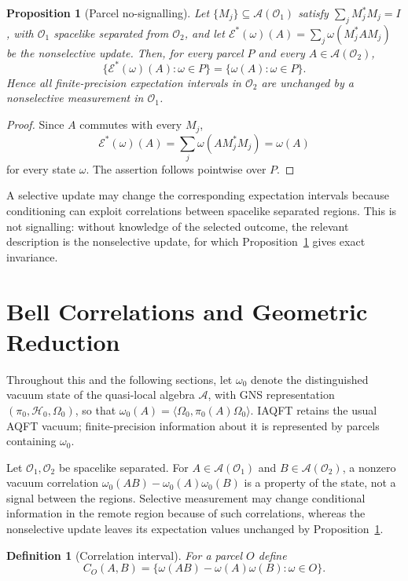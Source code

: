 \documentclass[11pt]{article}
\newtheorem{definition}[theorem]{Definition}
\newtheorem{proposition}[theorem]{Proposition}
\newcommand{\A}{\mathcal{A}}
\begin{document}
\begin{proposition}[Parcel no-signalling]
\label{prop:nosignalling}
Let $\{M_j\}\subseteq\A(\mathcal O_1)$ satisfy
$\sum_jM_j^*M_j=I$, with $\mathcal O_1$ spacelike separated from
$\mathcal O_2$, and let
$\mathcal E^*(\omega)(A)=\sum_j\omega(M_j^*AM_j)$ be the nonselective
update. Then, for every parcel $P$ and every $A\in\A(\mathcal O_2)$,
\[
\{\mathcal E^*(\omega)(A):\omega\in P\}
=
\{\omega(A):\omega\in P\}.
\]
Hence all finite-precision expectation intervals in $\mathcal O_2$ are
unchanged by a nonselective measurement in $\mathcal O_1$.
\end{proposition}

\begin{proof}
Since $A$ commutes with every $M_j$,
\[
\mathcal E^*(\omega)(A)
=
\sum_j\omega(AM_j^*M_j)
=
\omega(A)
\]
for every state $\omega$. The assertion follows pointwise over $P$.
\end{proof}

A selective update may change the corresponding expectation intervals
because conditioning can exploit correlations between spacelike separated
regions. This is not signalling: without knowledge of the selected outcome,
the relevant description is the nonselective update, for which
Proposition~\ref{prop:nosignalling} gives exact invariance.
\section{Bell Correlations and Geometric Reduction}
\label{sec:Bell-correlation}

Throughout this and the following sections, let $\omega_0$ denote the
distinguished vacuum state of the quasi-local algebra $\A$, with GNS
representation $(\pi_0,\mathcal H_0,\Omega_0)$, so that
$\omega_0(A)=\langle\Omega_0,\pi_0(A)\Omega_0\rangle$. IAQFT retains the
usual AQFT vacuum; finite-precision information about it is represented
by parcels containing $\omega_0$.

Let $\mathcal O_1,\mathcal O_2$ be spacelike separated. For
$A\in\A(\mathcal O_1)$ and $B\in\A(\mathcal O_2)$, a nonzero vacuum
correlation
$\omega_0(AB)-\omega_0(A)\omega_0(B)$ is a property of the state, not a
signal between the regions. Selective measurement may change conditional
information in the remote region because of such correlations, whereas
the nonselective update leaves its expectation values unchanged by
Proposition~\ref{prop:nosignalling}.

\begin{definition}[Correlation interval]
\label{def:correlationinterval}
For a parcel $O$ define
\[
C_O(A,B)
=
\{\omega(AB)-\omega(A)\omega(B):\omega\in O\}.
\]
\end{definition}
\end{document}
